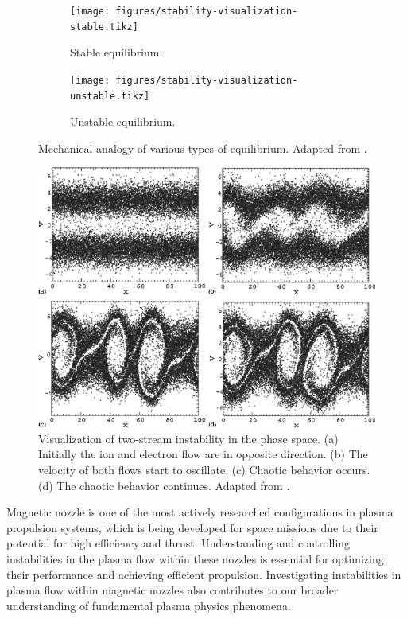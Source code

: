 \begin{figure}[htbp]
	\centering
	\begin{subfigure}[b]{0.5\textwidth}
		\centering
		\texttt{[image: figures/stability-visualization-stable.tikz]}
		\caption{Stable equilibrium.}
	\end{subfigure}%
	\begin{subfigure}[b]{0.5\textwidth}
		\centering
		\texttt{[image: figures/stability-visualization-unstable.tikz]}
		\caption{Unstable equilibrium.}
	\end{subfigure}
	\caption{Mechanical analogy of various types of equilibrium. Adapted from \cite{chen_introduction_2016}.}
	\label{fig:stability-visualization}
\end{figure}

\begin{figure}[htbp]
	\centering
	\includegraphics[width=0.7\linewidth]{figures/two-stream-instability}
	\caption{Visualization of two-stream instability in the phase space. (a) Initially the ion and electron flow are in opposite direction. (b) The velocity of both flows start to oscillate. (c) Chaotic behavior occurs. (d) The chaotic behavior continues. Adapted from \cite{ha_nonlinear_2011}.}
	\label{fig:two-stream-instability}
\end{figure}

Magnetic nozzle is one of the most actively researched configurations in plasma propulsion systems, which is being developed for space missions due to their potential for high efficiency and thrust. Understanding and controlling instabilities in the plasma flow within these nozzles is essential for optimizing their performance and achieving efficient propulsion. Investigating instabilities in plasma flow within magnetic nozzles also contributes to our broader understanding of fundamental plasma physics phenomena.


